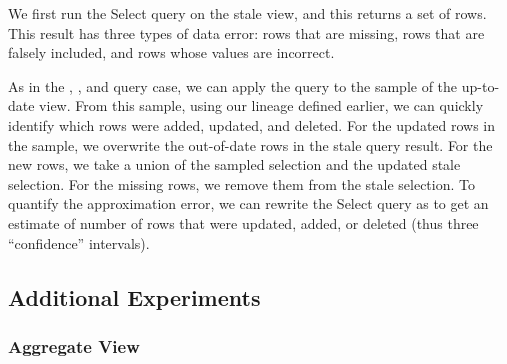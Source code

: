 We first run the Select query on the stale view, and this returns a set of rows.
This result has three types of data error: rows that are missing, rows that are falsely included, and rows whose values are incorrect.

As in the \sumfunc, \countfunc, and \avgfunc query case, we can apply the query to the sample of the up-to-date view.
From this sample, using our lineage defined earlier, we can quickly identify which rows were added, updated, and deleted.
For the updated rows in the sample, we overwrite the out-of-date rows in the stale query result.
For the new rows, we take a union of the sampled selection and the updated stale selection.
For the missing rows, we remove them from the stale selection.
To quantify the approximation error, we can rewrite the Select query as \countfunc to get an estimate of number of rows that were updated, added, or deleted (thus three ``confidence'' intervals).

\subsection{Additional Experiments}

\subsubsection{Aggregate View}
\label{exp-datacube}

